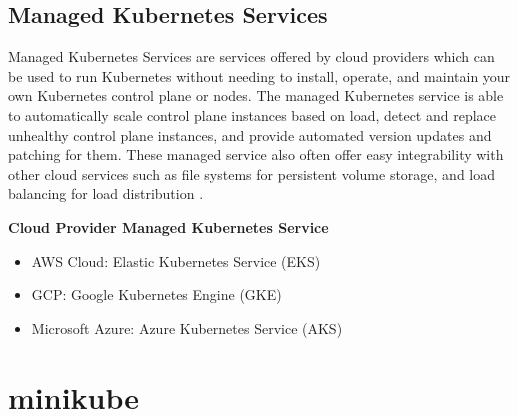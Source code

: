 \subsection{Managed Kubernetes Services}

Managed Kubernetes Services are services offered by cloud providers which can be used to run Kubernetes without needing to install, operate, and maintain your own Kubernetes control plane or nodes. The managed Kubernetes service is able to automatically scale control plane instances based on load, detect and replace unhealthy control plane instances, and provide automated version updates and patching for them. These managed service also often offer easy integrability with other cloud services such as file systems for persistent volume storage, and load balancing for load distribution \cite{sujatha-no-date}.

\textbf{Cloud Provider Managed Kubernetes Service}
\begin{itemize}
    \vspace{-1em}
\item AWS Cloud: Elastic Kubernetes Service (EKS)
\item GCP: Google Kubernetes Engine (GKE)
\item Microsoft Azure: Azure Kubernetes Service (AKS)
\end{itemize}

\section{minikube}



